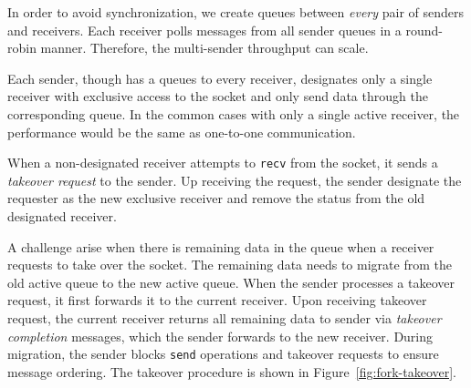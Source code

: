 In order to avoid synchronization, we create queues between \emph{every} pair of senders and receivers. %
Each receiver polls messages from all sender queues in a round-robin manner. Therefore, the multi-sender throughput can scale.

Each sender, though has a queues to every receiver, designates only a single receiver with exclusive access to the socket and only send data through the corresponding queue. 
In the common cases with only a single active receiver, the performance would be the same as one-to-one communication. 

When a non-designated receiver attempts to \texttt{recv} from the socket, it sends a \textit{takeover request} to the sender. 
Up receiving the request, the sender %
designate the requester as the new exclusive receiver and remove the status from the old designated receiver. 

A challenge arise when there is remaining data in the queue when a receiver requests to take over the socket. %
The remaining data needs to migrate from the old active queue to the new active queue. When the sender processes a takeover request, it first forwards it to the current receiver. Upon receiving takeover request, the current receiver returns all remaining data to sender via \textit{takeover completion} messages, which the sender forwards to the new receiver. During migration, the sender blocks \texttt{send} operations and takeover requests to ensure message ordering. The takeover procedure is shown in Figure~\ref{fig:fork-takeover}.


